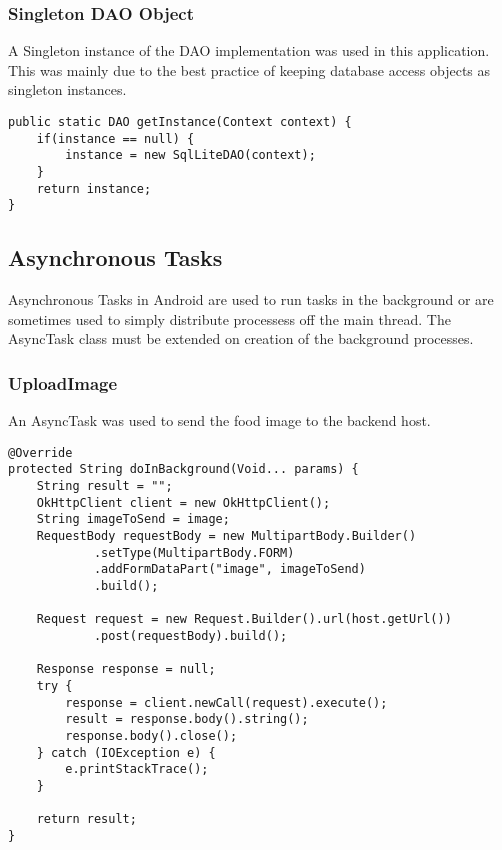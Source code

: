 \tocless\subsubsection{Singleton DAO Object}
A Singleton instance of the DAO implementation was used in this application.
This was mainly due to the best practice of keeping database access objects as singleton instances.
\begin{lstlisting}[style=Java]
public static DAO getInstance(Context context) {
    if(instance == null) {
        instance = new SqlLiteDAO(context);
    }
    return instance;
}
\end{lstlisting}

\tocless\subsection{Asynchronous Tasks}
Asynchronous Tasks in Android are used to run tasks in the background or are sometimes used to simply distribute processess off the main thread.
The AsyncTask class must be extended on creation of the background processes.

\tocless\subsubsection{UploadImage}
An AsyncTask was used to send the food image to the backend host.
\begin{lstlisting}[style=Java]
@Override
protected String doInBackground(Void... params) {
    String result = "";
    OkHttpClient client = new OkHttpClient();
    String imageToSend = image;
    RequestBody requestBody = new MultipartBody.Builder()
            .setType(MultipartBody.FORM)
            .addFormDataPart("image", imageToSend)
            .build();

    Request request = new Request.Builder().url(host.getUrl())
            .post(requestBody).build();

    Response response = null;
    try {
        response = client.newCall(request).execute();
        result = response.body().string();
        response.body().close();
    } catch (IOException e) {
        e.printStackTrace();
    }

    return result;
}
\end{lstlisting}


